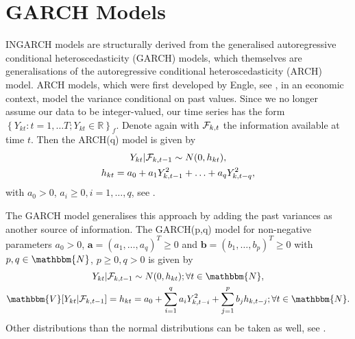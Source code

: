 
\section{GARCH Models}
\label{sec: Garch Models}

INGARCH models are structurally derived from the generalised autoregressive conditional heteroscedasticity (GARCH) models, which themselves are generalisations of the autoregressive conditional heteroscedasticity (ARCH) model. ARCH models, which were first developed by Engle, see \textcite{Engle:1982}, in an economic context, model the variance conditional on past values. Since we no longer assume our data to be integer-valued, our time series has the form $\left\{Y_{kt}:t=1,\ldots T; Y_{kt} \in \mathbb{R}\right\}_f$. Denote again with $\mathcal{F}_{k,t}$ the information available at time $t$. Then the ARCH(q) model is given by 
\begin{equation}
\begin{gathered}
Y_{kt} | \mathcal{F}_{k,t-1} \sim N(0,h_{kt}),\\
h_{kt} = a_0 + a_1 Y_{k,t-1}^2 + \ldots + a_q Y_{k,t-q}^2,
\label{eq:ARCH model}
\end{gathered}
\end{equation}
%
with $a_0 > 0$, $a_i\geq 0, i = 1,\ldots,q$, see \textcite{Bera:1993}. %

The GARCH model generalises this approach by adding the past variances as another source of information. The GARCH(p,q) model for non-negative parameters $a_0>0$, $\bm{a}=(a_1,\ldots,a_q)^T\geq 0$ and $\bm{b}=(b_1,\ldots,b_p)^T\geq0$ with $p,q \in \mathbbm{N}$, $p\geq0, q>0$ is given by 
\begin{equation}
\begin{gathered}
Y_{kt} | \SigA_{k,t-1} \sim N(0,h_{kt}); \forall t \in \mathbbm{N}, \\
\mathbbm{V}[Y_{kt}|\SigA_{k,t-1}]=h_{kt} = a_0 + \sum_{i=1}^q a_i Y_{k,t-i}^2 + \sum_{j=1}^p b_j h_{k,t-j};\forall t \in \mathbbm{N}.
\label{eq:GARCH model}
\end{gathered}
\end{equation}
%
Other distributions than the normal distributions can be taken as well, see \textcite{Bollerslev:1986}. 

